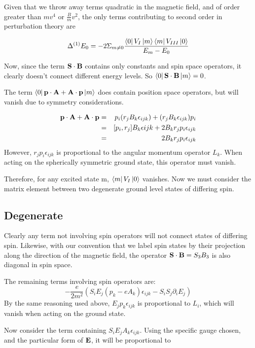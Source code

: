 Given that we throw away terms quadratic in the magnetic field, and of order greater than $mv^4$ or $\frac{B}{m}v^2$, the only terms contributing to second order in perturbation theory are

\[ \Delta^{(1)} E_0 = -2\Sigma_{m \neq 0} \frac {\matrixel{0}{V_{I}}{m} \matrixel{m}{V_{III}}{0}} { E_m - E_0 }	\]

Now, since the term $\mathbf{S} \cdot \mathbf{B}$ contains only constants and spin space operators, it clearly doesn't connect different energy levels.  So $\matrixel{0}{\v{S} \cdot \v{B}}{m} = 0$.

The term $\matrixel{0}{\v{p} \cdot \v{A} + \v{A} \cdot \v{p}}{m}$ does contain position space operators, but will vanish due to symmetry considerations.

\begin{eqnarray*}
 \mathbf{p} \cdot \mathbf{A} + \mathbf{A} \cdot \mathbf{p} 
	&=&	p_i (r_j B_k \epsilon_{ijk} ) + (r_j B_k \epsilon_{ijk}) p_i	\\
	&=&	[p_i, r_j] B_k \epsilon{ijk} + 2 B_k r_j p_i  \epsilon_{ijk}	\\
	&=&	2 B_k r_j p_i  \epsilon_{ijk}
\end{eqnarray*}
However, $ r_j p_i \epsilon_{ijk}$ is proportional to the angular momentum operator $L_k$.  When acting on the spherically symmetric ground state, this operator must vanish.

Therefore, for any excited state m, $\matrixel{m}{V_{I}}{0}$ vanishes.  Now we must consider the matrix element between two degenerate ground level states of differing spin.

\subsection{Degenerate}
Clearly any term not involving spin operators will not connect states of differing spin.  Likewise, with our convention that we label spin states by their projection along the direction of the magnetic field, the operator $\mathbf{S} \cdot \mathbf{B} = S_3 B_3$ is also diagonal in spin space.

The remaining terms involving spin operators are:
\[	 -\frac{e}{2m^2} ( S_i E_j (p_k - eA_k) \epsilon_{ijk} - S_i S_j \partial_i E_j) \]
By the same reasoning used above, $E_j p_k \epsilon_{ijk}$ is proportional to $L_i$, which will vanish when acting on the ground state.

Now consider the term containing $S_i E_j A_k \epsilon_{ijk}$.  Using the specific gauge chosen, and the particular form of $\mathbf{E}$, it will be proportional to 

